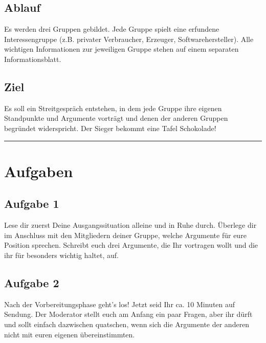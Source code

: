 \documentclass[11pt,a4paper,DIV=10,BCOR=0mm]{scrartcl}
\begin{document}
\subsection*{Ablauf}
Es werden drei Gruppen gebildet. Jede Gruppe spielt eine erfundene Interessengruppe (z.B. privater Verbraucher, Erzeuger, Softwarehersteller). Alle wichtigen Informationen zur jeweiligen Gruppe stehen auf einem separaten Informationsblatt.
\subsection*{Ziel}
Es soll ein Streitgespräch entstehen, in dem jede Gruppe ihre eigenen
Standpunkte und Argumente vorträgt und denen der anderen Gruppen
begründet widerspricht. Der Sieger bekommt eine Tafel Schokolade! \\
\hrule
\section*{Aufgaben}
\subsection*{Aufgabe 1}
Lese  dir zuerst Deine Ausgangssituation alleine und in Ruhe durch. Überlege dir im Anschluss mit den Mitgliedern deiner Gruppe, welche Argumente für eure Position sprechen. Schreibt euch drei Argumente, die
Ihr vortragen wollt und die ihr für besonders wichtig haltet, auf. 
\subsection*{Aufgabe 2}
Nach der Vorbereitungsphase geht’s los! Jetzt seid Ihr ca. 10 Minuten auf Sendung. Der Moderator stellt euch am Anfang ein paar Fragen, aber ihr dürft und sollt einfach dazwischen quatschen, wenn sich die Argumente
der anderen nicht mit euren eigenen übereinstimmten.
\end{document}
